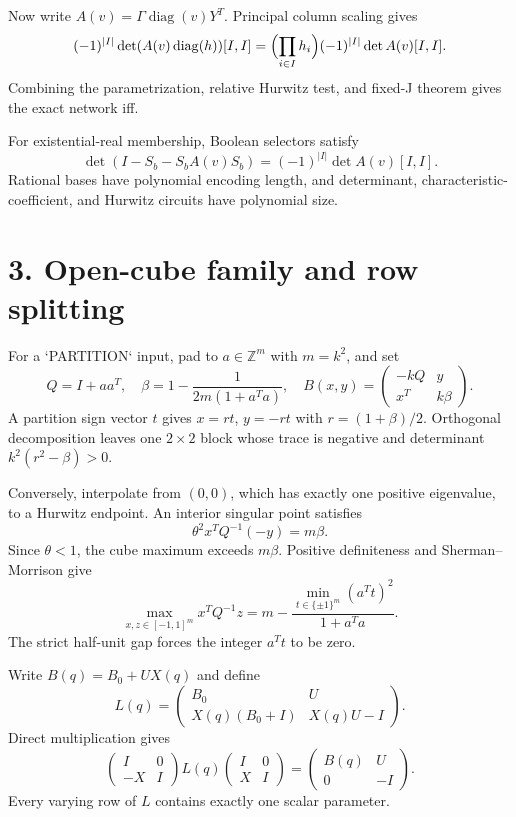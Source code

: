 \documentclass[10pt]{article}
\newcommand{\diag}{\operatorname{diag}}
\begin{document}
Now write $A(v)=\Gamma\diag(v)Y^T$.  Principal column scaling gives
\[
 (-1)^{|I|}\det(A(v)\diag(h))[I,I]
 =\Bigl(\prod_{i\in I}h_i\Bigr)(-1)^{|I|}\det A(v)[I,I].
\]
Combining the parametrization, relative Hurwitz test, and fixed-J theorem gives
the exact network iff.

For existential-real membership, Boolean selectors satisfy
\[
 \det(I-S_b-S_bA(v)S_b)=(-1)^{|I|}\det A(v)[I,I].
\]
Rational bases have polynomial encoding length, and determinant,
characteristic-coefficient, and Hurwitz circuits have polynomial size.

\newpage
\section*{3. Open-cube family and row splitting}
For a `PARTITION` input, pad to $a\in\mathbb Z^m$ with $m=k^2$, and set
\[
 Q=I+aa^T,
 \quad\beta=1-\frac1{2m(1+a^Ta)},
 \quad B(x,y)=\begin{pmatrix}-kQ&y\\x^T&k\beta\end{pmatrix}.
\]
A partition sign vector $t$ gives $x=rt$, $y=-rt$ with
$r=(1+\beta)/2$.  Orthogonal decomposition leaves one $2\times2$ block whose
trace is negative and determinant $k^2(r^2-\beta)>0$.

Conversely, interpolate from $(0,0)$, which has exactly one positive
eigenvalue, to a Hurwitz endpoint.  An interior singular point satisfies
\[
 \theta^2x^TQ^{-1}(-y)=m\beta.
\]
Since $\theta<1$, the cube maximum exceeds $m\beta$.  Positive definiteness and
Sherman--Morrison give
\[
 \max_{x,z\in[-1,1]^m}x^TQ^{-1}z
 =m-\frac{\min_{t\in\{\pm1\}^m}(a^Tt)^2}{1+a^Ta}.
\]
The strict half-unit gap forces the integer $a^Tt$ to be zero.

Write $B(q)=B_0+UX(q)$ and define
\[
 L(q)=\begin{pmatrix}B_0&U\\X(q)(B_0+I)&X(q)U-I\end{pmatrix}.
\]
Direct multiplication gives
\[
 \begin{pmatrix}I&0\\-X&I\end{pmatrix}L(q)
 \begin{pmatrix}I&0\\X&I\end{pmatrix}
 =\begin{pmatrix}B(q)&U\\0&-I\end{pmatrix}.
\]
Every varying row of $L$ contains exactly one scalar parameter.
\end{document}
